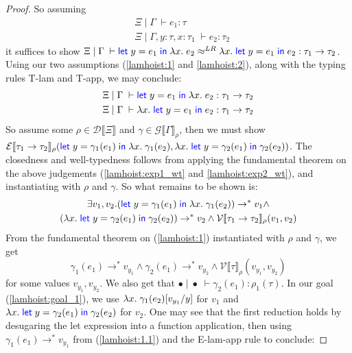 \documentclass[a4paper, 11pt]{report}
\theoremstyle{definition}
\newcommand{\var}{x}
\newcommand{\varB}{y}
\newcommand{\expr}{e}
\newcommand{\val}{v}
\newcommand{\subst}[3]{#1{\left[#3 \middle/ #2 \right]}}
\newcommand{\Tfunc}[2]{#1 \rightarrow #2}
\newcommand{\typ}{\tau}
\newcommand{\venv}{\Gamma}
\newcommand{\tenv}{\Xi}
\newcommand{\emptenv}{\bullet}
\newcommand{\empvenv}{\bullet}
\newcommand{\jdg}[4]{#1 \; | \; #2 \; \vdash #3 : #4}
\newcommand{\jdgRel}[6]{#1 \; | \; #2 \; \vdash #3 \approx^{#4} #5 : #6}
\newcommand{\stepS}{\rightarrow^*}
\newcommand{\ValInp}[2]{\mathcal{V} \llbracket #1 \rrbracket_{#2}}
\newcommand{\ExpInp}[2]{\mathcal{E} \llbracket #1 \rrbracket_{#2}}
\newcommand{\VenvInp}[2]{\mathcal{G} \llbracket #1 \rrbracket_{#2}}
\newcommand{\TenvInp}[1]{\mathcal{D} \llbracket #1 \rrbracket}
\newcommand{\LogRel}[5]{\jdgRel{#1}{#2}{#3}{LR}{#4}{#5}}
\begin{document}
\begin{proof}
  So assuming 
  \begin{align}
    &\jdg{\tenv}{\venv}{\expr_1}{\typ}\label{lamhoist:1}\\
    &\jdg{\tenv}{\venv, \varB : \typ, \var : \typ_1}{\expr_2}{\typ_2}\label{lamhoist:2}
  \end{align}
  it suffices to show $\LogRel{\tenv}{\venv}{\Let \varB = \expr_1 in \fun \var . \expr_2}{\fun \var . \Let \varB = \expr_1 in \expr_2}{\Tfunc{\typ_1}{\typ_2}}$. Using our two assumptions (\ref*{lamhoist:1} and \ref*{lamhoist:2}), along with the typing rules T-lam and T-app, we may conclude:
  \begin{align}
    &\jdg{\tenv}{\venv}{\Let \varB = \expr_1 in \fun \var . \expr_2}{\Tfunc{\typ_1}{\typ_2}}\label{lamhoist:exp1_wt}\\
    &\jdg{\tenv}{\venv}{\fun \var . \Let \varB = \expr_1 in \expr_2}{\Tfunc{\typ_1}{\typ_2}}\label{lamhoist:exp2_wt}
  \end{align}
  So assume some $\rho \in \TenvInp{\tenv}$ and $\gamma \in \VenvInp{\venv}{\rho}$, then we must show $\ExpInp{\Tfunc{\typ_1}{\typ_2}}{\rho}(\Let \varB = \gamma_1(\expr_1) in \fun \var . \gamma_1(\expr_2), \fun \var . \Let \varB = \gamma_2(\expr_1) in \gamma_2(\expr_2))$.
  The closedness and well-typedness follows from applying the fundamental theorem on the above judgements (\ref*{lamhoist:exp1_wt} and \ref*{lamhoist:exp2_wt}), and instantiating with $\rho$ and $\gamma$. So what remains to be shown is:
  \begin{multline}\label{lamhoist:goal_1}
    \exists \val_1, \val_2 . (\Let \varB = \gamma_1(\expr_1) in \fun \var . \gamma_1(\expr_2)) \stepS \val_1 \land\\
    (\fun \var . \Let \varB = \gamma_2(\expr_1) in \gamma_2(\expr_2)) \stepS \val_2 \land
    \ValInp{\Tfunc{\typ_1}{\typ_2}}{\rho}(\val_1, \val_2)
  \end{multline}
  From the fundamental theorem on (\ref{lamhoist:1}) instantiated with $\rho$ and $\gamma$, we get
  \begin{equation}\label{lamhoist:1.1}
    \gamma_1(\expr_1) \stepS \val_{y_1} \land \gamma_2(\expr_1) \stepS \val_{y_2} \land \ValInp{\typ}{\rho}(\val_{y_1}, \val_{y_2})
  \end{equation}
  for some values $\val_{y_1}, \val_{y_2}$. We also get that $\jdg{\emptenv}{\empvenv}{\gamma_2(\expr_1)}{\rho_1(\typ)}$.
  In our goal (\ref{lamhoist:goal_1}), we use $\fun \var . \subst{\gamma_1(\expr_2)}{\varB}{\val_{y_1}}$ for $\val_1$ and $\fun \var . \Let \varB = \gamma_2(\expr_1) in \gamma_2(\expr_2)$ for $\val_2$. One may see that the first reduction holds by desugaring the let expression into a function application, then using $\gamma_1(\expr_1) \stepS \val_{y_1}$ from (\ref{lamhoist:1.1}) and the E-lam-app rule to conclude:

\end{proof}
\end{document}
